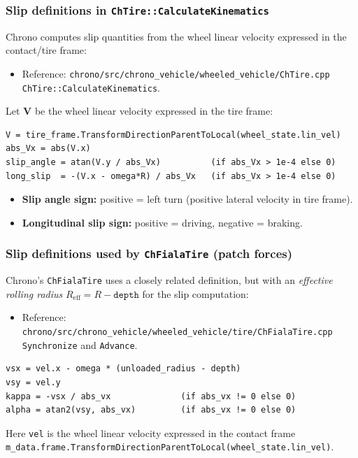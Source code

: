 \subsubsection{Slip definitions in \texttt{ChTire::CalculateKinematics}}
Chrono computes slip quantities from the wheel linear velocity expressed in the contact/tire frame:
\begin{itemize}
  \item Reference: \texttt{chrono/src/chrono\_vehicle/wheeled\_vehicle/ChTire.cpp} \texttt{ChTire::CalculateKinematics}.
\end{itemize}
\noindent
Let $\mathbf{V}$ be the wheel linear velocity expressed in the tire frame:
\begin{verbatim}
V = tire_frame.TransformDirectionParentToLocal(wheel_state.lin_vel)
abs_Vx = abs(V.x)
slip_angle = atan(V.y / abs_Vx)          (if abs_Vx > 1e-4 else 0)
long_slip  = -(V.x - omega*R) / abs_Vx   (if abs_Vx > 1e-4 else 0)
\end{verbatim}
\begin{itemize}
  \item \textbf{Slip angle sign:} positive = left turn (positive lateral velocity in tire frame).
  \item \textbf{Longitudinal slip sign:} positive = driving, negative = braking.
\end{itemize}

\subsubsection{Slip definitions used by \texttt{ChFialaTire} (patch forces)}
Chrono's \texttt{ChFialaTire} uses a closely related definition, but with an \emph{effective rolling radius}
$R_{\mathrm{eff}} = R - \texttt{depth}$ for the slip computation:
\begin{itemize}
  \item Reference: \texttt{chrono/src/chrono\_vehicle/wheeled\_vehicle/tire/ChFialaTire.cpp} \texttt{Synchronize} and \texttt{Advance}.
\end{itemize}
\begin{verbatim}
vsx = vel.x - omega * (unloaded_radius - depth)
vsy = vel.y
kappa = -vsx / abs_vx              (if abs_vx != 0 else 0)
alpha = atan2(vsy, abs_vx)         (if abs_vx != 0 else 0)
\end{verbatim}
Here \texttt{vel} is the wheel linear velocity expressed in the contact frame
\texttt{m_data.frame.TransformDirectionParentToLocal(wheel_state.lin_vel)}.

